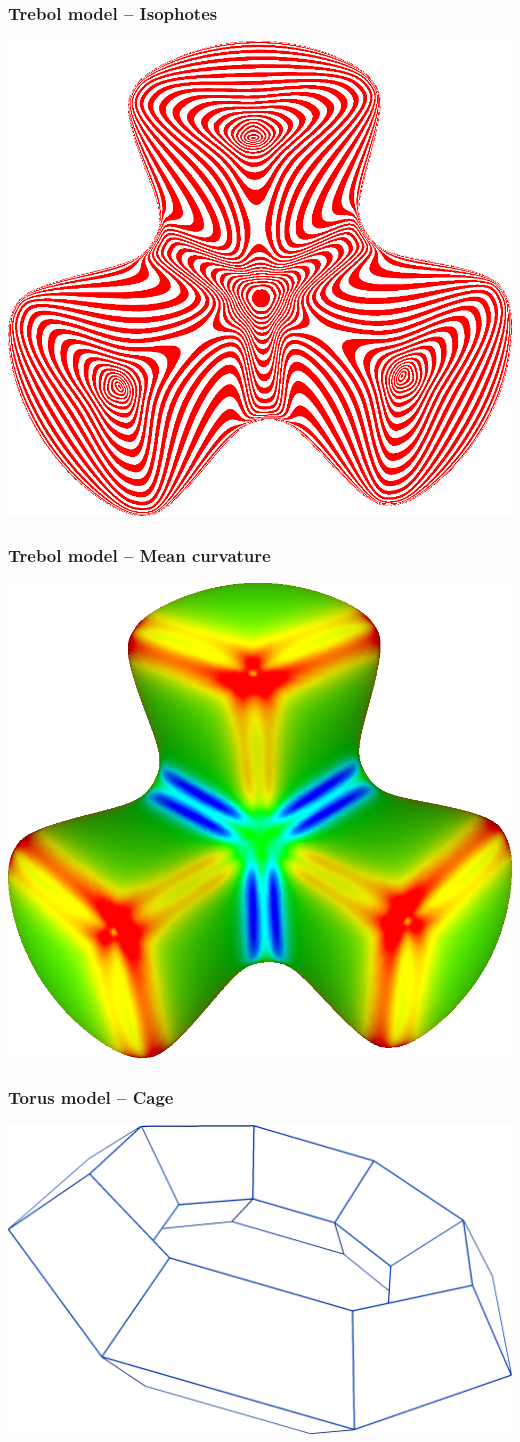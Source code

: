 \documentclass{beamer}
\begin{document}
\begin{frame}
  \frametitle{Trebol model -- Isophotes}
  \centering
  \includegraphics[width=.7\textwidth]{images/trebol-iso.png}
\end{frame}

\begin{frame}
  \frametitle{Trebol model -- Mean curvature}
  \centering
  \includegraphics[width=.7\textwidth]{images/trebol-mean.png}
\end{frame}

\begin{frame}
  \frametitle{Torus model -- Cage}
  \centering
  \includegraphics[width=.85\textwidth]{images/torus-cage.png}
\end{frame}
\end{document}
